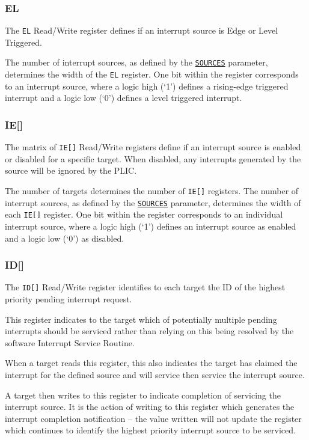 \documentclass[]{article}
\begin{document}
\subsubsection{EL}

The \texttt{EL} Read/Write register defines if an interrupt source is
Edge or Level Triggered.

The number of interrupt sources, as defined by the
\protect\hyperlink{SOURCES}{\texttt{SOURCES}} parameter, determines
the width of the \texttt{EL} register. One bit within the register
corresponds to an interrupt source, where a logic high (`1') defines a
rising-edge triggered interrupt and a logic low (`0') defines a level
triggered interrupt.

\subsubsection{IE[]}

The matrix of \texttt{IE[]} Read/Write registers define if an
interrupt source is enabled or disabled for a specific target. When
disabled, any interrupts generated by the source will be ignored by the
PLIC.

The number of targets determines the number of \texttt{IE[]}
registers. The number of interrupt sources, as defined by the
\protect\hyperlink{SOURCES}{\texttt{SOURCES}} parameter, determines the
width of each \texttt{IE[]} register. One bit within the register
corresponds to an individual interrupt source, where a logic high (`1')
defines an interrupt source as enabled and a logic low (`0') as
disabled.

\subsubsection{ID[]}

The \texttt{ID[]} Read/Write register identifies to each target
the ID of the highest priority pending interrupt request.

This register indicates to the target which of potentially multiple
pending interrupts should be serviced rather than relying on this being
resolved by the software Interrupt Service Routine.

When a target reads this register, this also indicates the target has
claimed the interrupt for the defined source and will service then
service the interrupt source.

A target then writes to this register to indicate completion of
servicing the interrupt source. It is the action of writing to this
register which generates the interrupt completion notification -- the
value written will not update the register which continues to identify
the highest priority interrupt source to be serviced.
\end{document}
